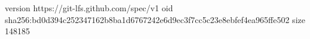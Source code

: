 version https://git-lfs.github.com/spec/v1
oid sha256:bd0d394c252347162b8ba1d6767242e6d9ec3f7cc5c23e8ebfef4ea965ffe502
size 148185

